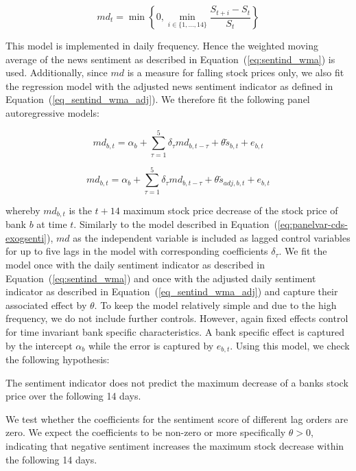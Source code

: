 \begin{equation}
	md_t = \min\left\{ 0, \min_{i\in\{1,...,14\}} \frac{S_{t+i}-S_t}{S_t} \right\}
\end{equation}


 This model is implemented in daily frequency. Hence the weighted moving average of the news sentiment as described in \mbox{Equation~(\ref{eq:sentind_wma})} is used. Additionally, since $md$ is a measure for falling stock prices only, we also fit the regression model with the adjusted news sentiment indicator as defined in \mbox{Equation~(\ref{eq_sentind_wma_adj})}. We therefore fit the following panel autoregressive models:

\begin{equation} \label{eq:mdd}
	md_{b,t} = \alpha_b + \sum_{\tau=1}^5\delta_\tau md_{b,t-\tau} + \theta \tilde{s}_{b,t} + e_{b,t}
\end{equation}

\begin{equation} \label{eq:mdd}
	md_{b,t} = \alpha_b + \sum_{\tau=1}^5\delta_\tau md_{b,t-\tau} + \theta \tilde{s}_{adj,b,t} + e_{b,t}
\end{equation}

whereby $md_{b,t}$ is the $t+14$ maximum stock price decrease of the stock price of bank $b$ at time $t$. Similarly to the model described in \mbox{Equation~(\ref{eq:panelvar-cds-exogsenti})}, $md$ as the independent variable is included as lagged control variables for up to five lags in the model with corresponding coefficients $\delta_\tau$. We fit the model once with the daily sentiment indicator as described in \mbox{Equation~(\ref{eq:sentind_wma})} and once with the adjusted daily sentiment indicator as described in \mbox{Equation~(\ref{eq_sentind_wma_adj})} and capture their associated effect by $\theta$. To keep the model relatively simple and due to the high frequency, we do not include further controls. However, again fixed effects control for time invariant bank specific characteristics. A bank specific effect is captured by the intercept $\alpha_b$ while the error is captured by $e_{b,t}$. Using this model, we check the following hypothesis:

\begin{hyp}
	The sentiment indicator does not predict the maximum decrease of a banks stock price over the following 14 days.
\end{hyp}

We test whether the coefficients for the sentiment score of different lag orders are zero. We expect the coefficients to be non-zero or more specifically $\theta>0$, indicating that negative sentiment increases the maximum stock decrease within the following 14 days. \\

